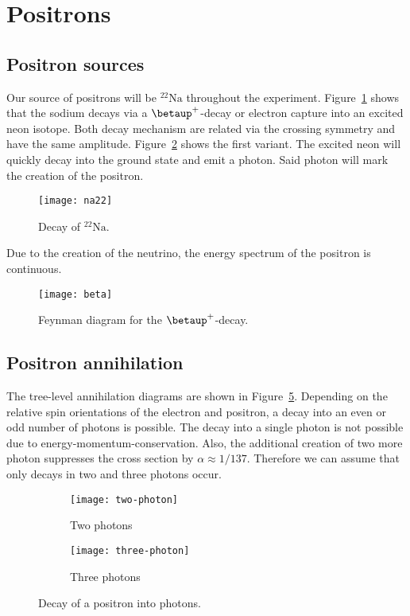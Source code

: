\documentclass[11pt, english, fleqn, DIV=15, headinclude, BCOR=2cm]{scrreprt}
\begin{document}
\section{Positrons}

\subsection{Positron sources}

Our source of positrons will be $\mathrm{^{22}Na}$ throughout the experiment.
Figure~\ref{fig:na22} shows that the sodium decays via a $\betaup^+$-decay or
electron capture into an excited neon isotope. Both decay mechanism are related
via the crossing symmetry and have the same amplitude. Figure~\ref{fig:beta}
shows the first variant. The excited neon will quickly decay into the ground
state and emit a photon. Said photon will mark the creation of the positron.

\begin{figure}
    \centering
    \texttt{[image: na22]}
    \caption{%
        Decay of $\mathrm{^{22}Na}$.
    }
    \label{fig:na22}
\end{figure}

Due to the creation of the neutrino, the energy spectrum of the positron is
continuous.

\begin{figure}
    \centering
    \texttt{[image: beta]}
    \caption{%
        Feynman diagram for the $\betaup^+$-decay.
    }
    \label{fig:beta}
\end{figure}

\subsection{Positron annihilation}

The tree-level annihilation diagrams are shown in
Figure~\ref{fig:annihilation}. Depending on the relative spin orientations of
the electron and positron, a decay into an even or odd number of photons is
possible. The decay into a single photon is not possible due to
energy-momentum-conservation. Also, the additional creation of two more photon
suppresses the cross section by $\alpha \approx 1/137$. Therefore we can assume
that only decays in two and three photons occur.

\begin{figure}
    \centering
    \begin{subfigure}[c]{0.48\linewidth}
        \centering
        \texttt{[image: two-photon]}
        \caption{%
            Two photons
        }
        \label{fig:/1}
    \end{subfigure}
    \hfill
    \begin{subfigure}[c]{0.48\linewidth}
        \centering
        \texttt{[image: three-photon]}
        \caption{%
            Three photons
        }
        \label{fig:/2}
    \end{subfigure}
    \caption{%
        Decay of a positron into photons.
    }
    \label{fig:annihilation}
\end{figure}
\end{document}
